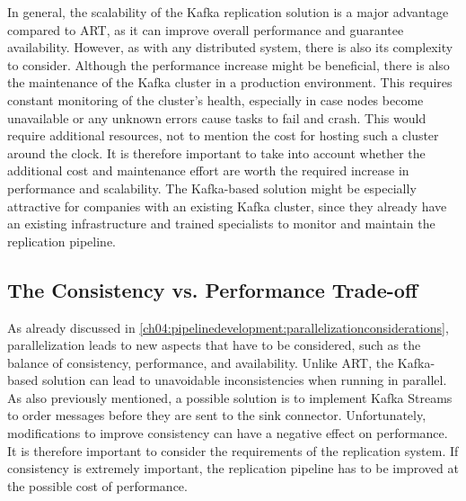 In general, the scalability of the Kafka replication solution is a major advantage compared to \ac{ART}, as it can improve overall performance and guarantee availability. However, as with any distributed system, there is also its complexity to consider. Although the performance increase might be beneficial, there is also the maintenance of the Kafka cluster in a production environment. This requires constant monitoring of the cluster's health, especially in case nodes become unavailable or any unknown errors cause tasks to fail and crash. This would require additional resources, not to mention the cost for hosting such a cluster around the clock. It is therefore important to take into account whether the additional cost and maintenance effort are worth the required increase in performance and scalability. The Kafka-based solution might be especially attractive for companies with an existing Kafka cluster, since they already have an existing infrastructure and trained specialists to monitor and maintain the replication pipeline.

\subsection{The Consistency vs. Performance Trade-off}
As already discussed in \ref{ch04:pipelinedevelopment:parallelizationconsiderations}, parallelization leads to new aspects that have to be considered, such as the balance of consistency, performance, and availability. Unlike \ac{ART}, the Kafka-based solution can lead to unavoidable inconsistencies when running in parallel. As also previously mentioned, a possible solution is to implement Kafka Streams to order messages before they are sent to the sink connector. Unfortunately, modifications to improve consistency can have a negative effect on performance. It is therefore important to consider the requirements of the replication system. If consistency is extremely important, the replication pipeline has to be improved at the possible cost of performance.

